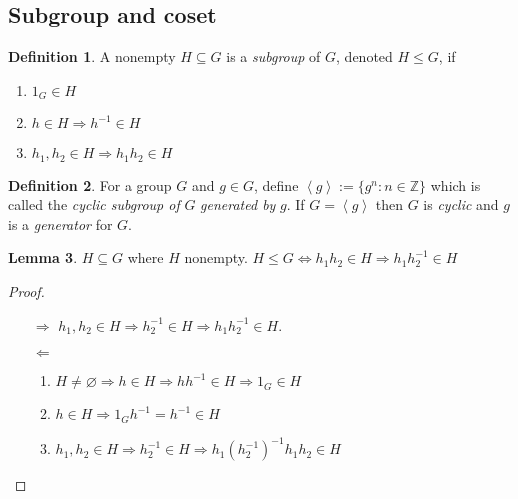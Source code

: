\documentclass[a4paper]{article}
\newcommand{\la}{\left\langle}
\newcommand{\ra}{\right\rangle}
\newcommand{\Z}{\mathbb{Z}}
\theoremstyle{definition}
\newtheorem{defn}{Definition}[subsection]
\newtheorem{lemma}[defn]{Lemma}
\begin{document}
\subsection{Subgroup and coset}
\begin{defn}
A nonempty $H\subseteq G$ is a \textit{subgroup} of $G$, denoted $H\leq G$, if
\begin{enumerate}
\item $1_G\in H$
\item $h\in H\Rightarrow h^{-1}\in H$
\item $h_1,h_2\in H \Rightarrow h_1h_2\in H$
\end{enumerate}
\end{defn}
\begin{defn}
For a group $G$ and $g\in G$, define $\la g\ra:=\{g^n:n\in\Z\}$ which is called the \textit{cyclic subgroup of} $G$ \textit{generated by} $g$. If $G=\la g\ra$ then $G$ is \textit{cyclic} and $g$ is a \textit{generator} for $G$.
\end{defn}
\begin{lemma}
\label{lemma:sgptest}
$H\subseteq G$ where $H$ nonempty. $H\leq G \Leftrightarrow h_1h_2\in H\Rightarrow h_1h_2^{-1}\in H$
\end{lemma}
\begin{proof}
\begin{itemize}
\item[$\Rightarrow$] $h_1,h_2\in H\Rightarrow h_2^{-1}\in H\Rightarrow h_1h_2^{-1}\in H$.
\item[$\Leftarrow$] \begin{enumerate}
\item $H\neq \varnothing\Rightarrow h\in H\Rightarrow hh^{-1}\in H\Rightarrow 1_G\in H$
\item $h\in H\Rightarrow 1_Gh^{-1}=h^{-1}\in H$
\item $h_1,h_2\in H\Rightarrow h_2^{-1}\in H\Rightarrow h_1(h_2^{-1})^{-1}h_1h_2\in H$
\end{enumerate}
\end{itemize}
\end{proof}
\end{document}
